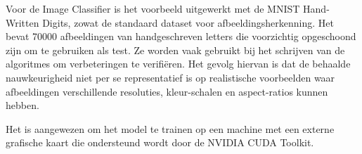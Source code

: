 Voor de Image Classifier is het voorbeeld uitgewerkt met de MNIST Hand-Written Digits, zowat de standaard dataset voor afbeeldingsherkenning. Het bevat 70000 afbeeldingen van handgeschreven letters die voorzichtig opgeschoond zijn om te gebruiken als test. Ze worden vaak gebruikt bij het schrijven van de algoritmes om verbeteringen te verifiëren. Het gevolg hiervan is dat de behaalde nauwkeurigheid niet per se representatief is op realistische voorbeelden waar afbeeldingen verschillende resoluties, kleur-schalen en aspect-ratios kunnen hebben.

Het is aangewezen om het model te trainen op een machine met een externe grafische kaart die ondersteund wordt door de NVIDIA CUDA Toolkit.